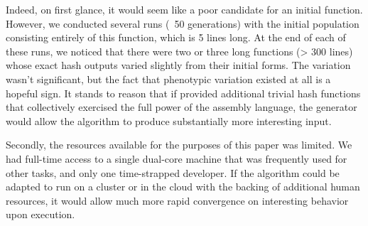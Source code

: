 \documentclass{article}
\begin{document}
Indeed, on first glance, it would seem like a poor candidate for an initial function. However, we conducted several runs (~50 generations) with the initial population consisting entirely of this function, which is 5 lines long. At the end of each of these runs, we noticed that there were two or three long functions (> 300 lines) whose exact hash outputs varied slightly from their initial forms. The variation wasn't significant, but the fact that phenotypic variation existed at all is a hopeful sign. It stands to reason that if provided additional trivial hash functions that collectively exercised the full power of the assembly language, the generator would allow the algorithm to produce substantially more interesting input.


Secondly, the resources available for the purposes of this paper was limited. We had full-time access to a single dual-core machine that was frequently used for other tasks, and only one time-strapped developer. If the algorithm could be adapted to run on a cluster or in the cloud with the backing of additional human resources, it would allow much more rapid convergence on interesting behavior upon execution.
\end{document}
